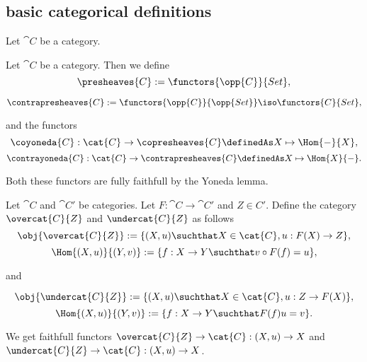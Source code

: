 \subsection{basic categorical definitions}

\begin{notation}
Let $\cat{C}$ be a category.
\end{notation}

\begin{definition}
Let $\cat{C}$ be a category. Then we define
\[\presheaves{C} := \functors{\opp{C}}{Set},\]

\[\contrapresheaves{C} := \functors{\opp{C}}{\opp{Set}} \iso \functors{C}{Set},\]

and the functors 
\[\coyoneda{C} : \cat{C} \rightarrow \copresheaves{C} \definedAs X \mapsto \Hom{-}{X},\]
\[\contrayoneda{C} : \cat{C} \rightarrow \contrapresheaves{C} \definedAs  X \mapsto \Hom{X}{-}.\]

Both these functors are fully faithfull by the Yoneda lemma.
\end{definition}

\begin{definition}
Let $\cat{C}$ and $\cat{C'}$ be categories. Let $F:\cat{C}\rightarrow \cat{C'}$ and $Z\in C'$. 
Define the category $\overcat{C}{Z}$ and $\undercat{C}{Z}$ as follows
\[\obj{\overcat{C}{Z}} := \{(X,u) \suchthat X\in \cat{C}, u:F(X)\rightarrow Z\},\]
\[\Hom{(X,u)}{(Y,v)} := \{f:X\rightarrow Y \suchthat v\circ F(f) = u  \},\]

and

\[\obj{\undercat{C}{Z}} := \{(X,u) \suchthat X\in \cat{C}, u:Z\rightarrow F(X)\},\]
\[\Hom{(X,u)}{(Y,v)} := \{f:X\rightarrow Y \suchthat F(f)u = v  \}.\]

We get faithfull functors 
$\overcat{C}{Z} \rightarrow \cat{C}: (X,u)\rightarrow X$ and 
$\undercat{C}{Z} \rightarrow \cat{C}: (X,u)\rightarrow X$.
\end{definition}